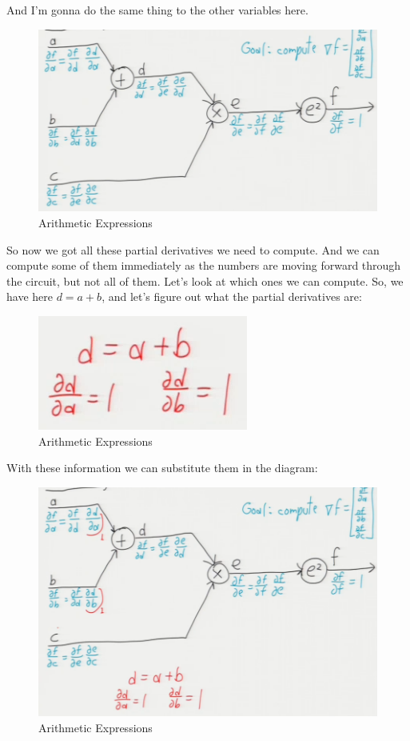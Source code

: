 \documentclass[fleqn,10pt]{olplainarticle}
\theoremstyle{definition}
\theoremstyle{remark}
\begin{document}
And I'm gonna do the same thing to the other variables here. 
\begin{figure}[ht]
\centering
\includegraphics[width=0.8\linewidth]{images/arithmetic_expression_2}
\caption{Arithmetic Expressions}
\label{fig:arithmetic_expression_2}
\end{figure}

So now we got all these partial derivatives we need to compute. And we can compute some of them immediately as the numbers are moving forward through the circuit, but not all of them. Let's look at which ones we can compute. So, we have here $d = a + b$, and let's figure out what the partial derivatives are:
\begin{figure}[ht]
\centering
\includegraphics[width=0.2\linewidth]{images/arithmetic_expression_3}
\caption{Arithmetic Expressions}
\label{fig:arithmetic_expression_3}
\end{figure}
\clearpage

With these information we can substitute them in the diagram:
\begin{figure}[ht]
\centering
\includegraphics[width=0.6\linewidth]{images/arithmetic_expression_4}
\caption{Arithmetic Expressions}
\label{fig:arithmetic_expression_4}
\end{figure}
\end{document}
